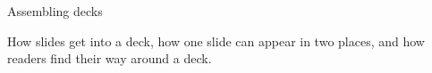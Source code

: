 
\begin{sectionframe}{Assembling decks}
	\begin{minipage}[t]{0.9\linewidth}\small
		How slides get into a deck, how one slide can appear in two places, and how readers find their way around a deck.
	\end{minipage}\par\medskip
	\SMChapterAgenda
\end{sectionframe}
